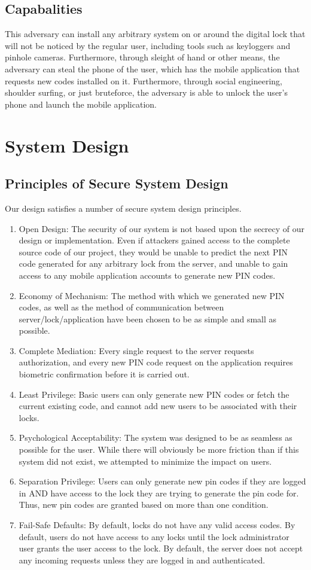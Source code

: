 \documentclass[conference]{IEEEtran}
\begin{document}
\subsection{Capabalities}
	This adversary can install any arbitrary system on or around the digital lock that will not be noticed by the regular user, including tools such as keyloggers and pinhole cameras. Furthermore, through sleight of hand or other means, the adversary can steal the phone of the user, which has the mobile application that requests new codes installed on it. Furthermore, through social engineering, shoulder surfing, or just bruteforce, the adversary is able to unlock the user’s phone and launch the mobile application.


\section{System Design}

\subsection{Principles of Secure System Design}
Our design satisfies a number of secure system design principles.
\begin{enumerate}
\item{Open Design: The security of our system is not based upon the secrecy of our design or implementation. Even if attackers gained access to the complete source code of our project, they would be unable to predict the next PIN code generated for any arbitrary lock from the server, and unable to gain access to any mobile application accounts to generate new PIN codes.}
\item{
Economy of Mechanism: The method with which we generated new PIN codes, as well as the method of communication between server/lock/application have been chosen to be as simple and small as possible.
}
\item{
Complete Mediation: Every single request to the server requests authorization, and every new PIN code request on the application requires biometric confirmation before it is carried out.
}
\item{
Least Privilege: Basic users can only generate new PIN codes or fetch the current existing code, and cannot add new users to be associated with their locks.
}
\item{
Psychological Acceptability: The system was designed to be as seamless as possible for the user. While there will obviously be more friction than if this system did not exist, we attempted to minimize the impact on users.
}
\item{
Separation Privilege: Users can only generate new pin codes if they are logged in AND have access to the lock they are trying to generate the pin code for. Thus, new pin codes are granted based on more than one condition.
}
\item{
Fail-Safe Defaults: By default, locks do not have any valid access codes. By default, users do not have access to any locks until the lock administrator user grants the user access to the lock. By default, the server does not accept any incoming requests unless they are logged in and authenticated.
}
\end{enumerate}
\end{document}
